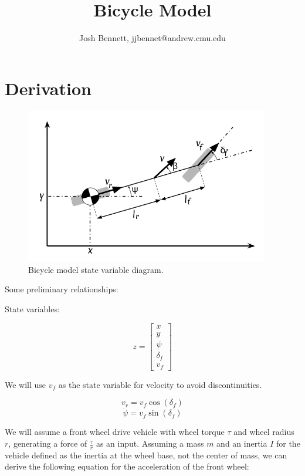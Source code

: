 \documentclass{article}
\theoremstyle{remark}
\theoremstyle{definition}
\begin{document}
\title{Bicycle Model}
\author{\Large Josh Bennett, jjbennet@andrew.cmu.edu}
\maketitle

\section{Derivation}

\begin{figure}[H]
    \label{fig:bicycle_model}
    \centering
        \includegraphics[width=0.95\textwidth]{bicycle_model_diagram.png}
    \caption{Bicycle model state variable diagram.}
\end{figure}

Some preliminary relationships:

State variables:

$$ z = \left \lbrack \begin{array}{c}  x \\ y \\ \psi \\ \delta_f \\ v_f \end{array} \right \rbrack $$

We will use $v_f$ as the state variable for velocity to avoid discontinuities.

$$ v_r = v_f \cos {( \delta_f) } $$
$$ \dot{\psi} = v_f \sin {( \delta_f) } $$

We will assume a front wheel drive vehicle with wheel torque $\tau$ and wheel radius $r$, generating a force of $\frac{\tau} r$ as an input. Assuming a mass $m$ and an inertia $I$ for the vehicle defined as the inertia at the wheel base, not the center of mass, we can derive the following equation for the acceleration of the front wheel:
\end{document}

